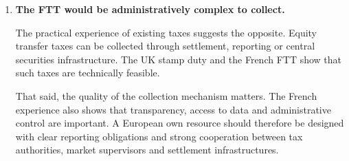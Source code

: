 \documentclass[../../main]{subfiles}
\begin{document}
\begin{enumerate}
The key challenge is therefore to calibrate exemptions carefully. If they are too narrow, useful liquidity provision may be affected. If they are too broad, the tax base is unnecessarily eroded. 


    \item \textbf{The FTT would be administratively complex to collect.}

    The practical experience of existing taxes suggests the opposite. Equity transfer taxes can be collected through settlement, reporting or central securities infrastructure. The UK stamp duty and the French FTT show that such taxes are technically feasible.

    That said, the quality of the collection mechanism matters. The French experience also shows that transparency, access to data and administrative control are important. A European own resource should therefore be designed with clear reporting obligations and strong cooperation between tax authorities, market supervisors and settlement infrastructures.








\end{enumerate}
\end{document}
